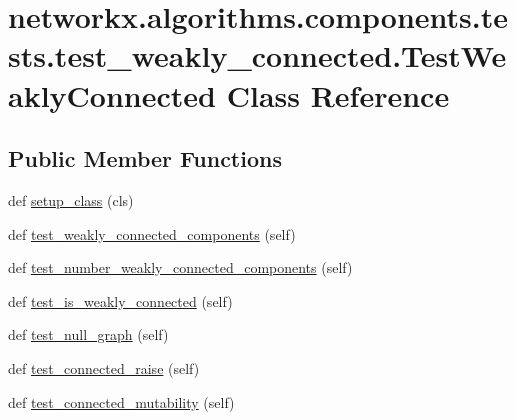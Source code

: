 \hypertarget{classnetworkx_1_1algorithms_1_1components_1_1tests_1_1test__weakly__connected_1_1TestWeaklyConnected}{}\section{networkx.\+algorithms.\+components.\+tests.\+test\+\_\+weakly\+\_\+connected.\+Test\+Weakly\+Connected Class Reference}
\label{classnetworkx_1_1algorithms_1_1components_1_1tests_1_1test__weakly__connected_1_1TestWeaklyConnected}
\subsection*{Public Member Functions}
\begin{DoxyCompactItemize}
\item 
def \hyperlink{classnetworkx_1_1algorithms_1_1components_1_1tests_1_1test__weakly__connected_1_1TestWeaklyConnected_ae9436011260e1ef62688814f17588f80}{setup\+\_\+class} (cls)
\item 
def \hyperlink{classnetworkx_1_1algorithms_1_1components_1_1tests_1_1test__weakly__connected_1_1TestWeaklyConnected_adacd0f44d0c15cf78034bfc767c30367}{test\+\_\+weakly\+\_\+connected\+\_\+components} (self)
\item 
def \hyperlink{classnetworkx_1_1algorithms_1_1components_1_1tests_1_1test__weakly__connected_1_1TestWeaklyConnected_a4b08e2910d78511183220d7895cfe05f}{test\+\_\+number\+\_\+weakly\+\_\+connected\+\_\+components} (self)
\item 
def \hyperlink{classnetworkx_1_1algorithms_1_1components_1_1tests_1_1test__weakly__connected_1_1TestWeaklyConnected_a0e6ca207a041945ae38b77d9f6e96f2b}{test\+\_\+is\+\_\+weakly\+\_\+connected} (self)
\item 
def \hyperlink{classnetworkx_1_1algorithms_1_1components_1_1tests_1_1test__weakly__connected_1_1TestWeaklyConnected_a2ae071931fc5f957881ffa1eb7d3ad9d}{test\+\_\+null\+\_\+graph} (self)
\item 
def \hyperlink{classnetworkx_1_1algorithms_1_1components_1_1tests_1_1test__weakly__connected_1_1TestWeaklyConnected_a7f4050b39956a64f38e33591d0c47b87}{test\+\_\+connected\+\_\+raise} (self)
\item 
def \hyperlink{classnetworkx_1_1algorithms_1_1components_1_1tests_1_1test__weakly__connected_1_1TestWeaklyConnected_ab83eb8e533c90f43c4de9ef05a3bc297}{test\+\_\+connected\+\_\+mutability} (self)
\end{DoxyCompactItemize}
